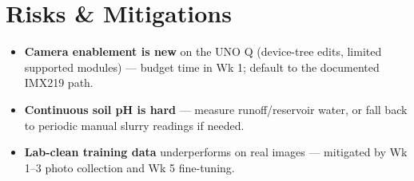 \documentclass[10pt]{article}
\begin{document}
\section*{Risks \& Mitigations}
\begin{itemize}
  \item \textbf{Camera enablement is new} on the UNO Q (device-tree edits, limited supported modules)
        --- budget time in Wk 1; default to the documented IMX219 path.
  \item \textbf{Continuous soil pH is hard} --- measure runoff/reservoir water, or fall back to periodic
        manual slurry readings if needed.
  \item \textbf{Lab-clean training data} underperforms on real images --- mitigated by Wk 1--3 photo
        collection and Wk 5 fine-tuning.
\end{itemize}
\end{document}
